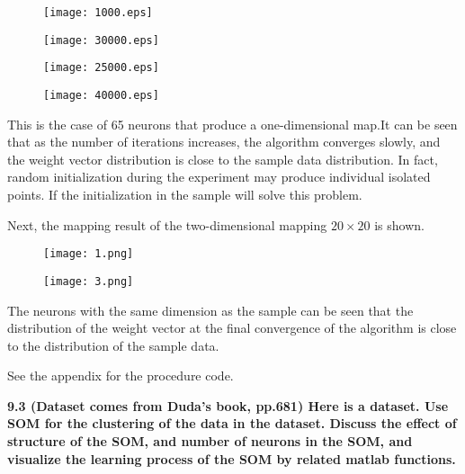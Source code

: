 \begin{figure}[!h]
\begin{minipage}
{0.5\linewidth}
\centering
\texttt{[image: 1000.eps]}
\end{minipage}
%
\begin{minipage}
{0.5\linewidth}
\centering
\texttt{[image: 30000.eps]}
\end{minipage}
\end{figure}

\begin{figure}[!h]
\begin{minipage}
{0.5\linewidth}
\centering
\texttt{[image: 25000.eps]}
\end{minipage}
%
\begin{minipage}
{0.5\linewidth}
\centering
\texttt{[image: 40000.eps]}
\end{minipage}
\end{figure}

This is the case of 65 neurons that produce a one-dimensional map.It can be seen that as the number of iterations increases, the algorithm converges slowly, and the weight vector distribution is close to the sample data distribution.
In fact, random initialization during the experiment may produce individual isolated points.
If the initialization in the sample will solve this problem.

Next, the mapping result of the two-dimensional mapping $20\times 20$ is shown.
\begin{figure}[!h]
  \centering
  \texttt{[image: 1.png]}
\end{figure}

\begin{figure}[!h]
  \centering
  \texttt{[image: 3.png]}
\end{figure}

The neurons with the same dimension as the sample can be seen that the distribution of the weight vector at the final convergence of the algorithm is close to the distribution of the sample data.

See the appendix for the procedure code.


\newpage
\noindent \textbf{9.3 (Dataset comes from Duda’s book, pp.681) Here is a dataset. Use SOM for the clustering of the data
in the dataset. Discuss the effect of structure of the SOM, and number of neurons in the SOM, and
visualize the learning process of the SOM by related matlab functions.}

